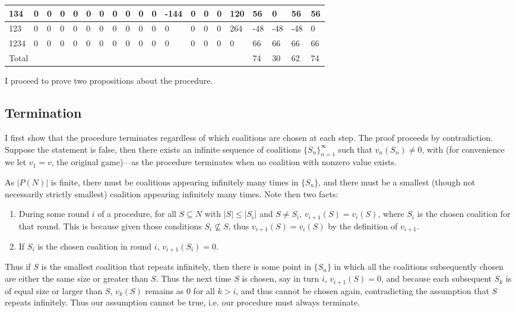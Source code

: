 \documentclass[12pt]{article}
\begin{document}
\begin{table}[h]
\begin{tabular}{|l|l|l|l|l|l|l|l|l|l|l|l|l|l|l|l|l|l|l|l|}
134  & 0  & 0  & 0  & 0  & 0  & 0   & 0   & 0   & 0    & 0   & -144 & 0    & 0   & 0    & 120  & 56     & 0      & 56     & 56    \\ \hline
123  & 0  & 0  & 0  & 0  & 0  & 0   & 0   & 0   & 0    & 0   & 0    & 0    & 0   & 0    & 264  & -48    & -48    & -48    & 0     \\ \hline
1234 & 0  & 0  & 0  & 0  & 0  & 0   & 0   & 0   & 0    & 0   & 0    & 0    & 0   & 0    & 0    & 66     & 66     & 66     & 66    \\ \hline
\multicolumn{16}{|l|}{Total}                                                                   & 74     & 30     & 62     & 74    \\ \hline
\end{tabular}
\end{table}

I proceed to prove two propositions about the procedure.

\subsection*{Termination}

I first show that the procedure terminates regardless of which coalitions are
chosen at each step. The proof proceeds by contradiction. Suppose the statement
is false,
then there exists an infinite sequence of coalitions $\{S_n\}_{n=1}^\infty$ such
that $v_{n}(S_n)\neq 0$, with (for convenience we let $v_1 = v$, the original
game)---as the procedure terminates when no coalition with nonzero value exists.

As $|P(N)|$ is finite, there must be coalitions appearing infinitely many times
in $\{S_n\}$, and there must be a smallest (though not necessarily strictly
smallest) coalition appearing infinitely many times. Note then two facts:
\begin{enumerate}
\item During some round $i$ of a procedure, for all $S \subseteq N$ with $|S|
  \leq |S_i|$ and $S \neq S_i$, $v_{i+1}(S) = v_i(S)$,
  where $S_i$ is the chosen coalition for that
  round. This is because given those conditions $S_i \not\subseteq S$, thus
  $v_{i+1}(S) = v_i(S)$ by the definition of $v_{i+1}$.
\item If $S_i$ is the chosen coalition in round $i$, $v_{i+1}(S_i) = 0$.
\end{enumerate}
Thus if $S$ is the smallest coalition that repeats infinitely, then there is some
point in $\{S_n\}$ in which all the coalitions subsequently chosen are either the
same size or greater than $S$. Thus the next time $S$ is chosen, say in turn
$i$, $v_{i+1}(S) = 0$, and because each subsequent $S_k$ is of equal size or
larger than $S$, $v_k(S)$ remains as 0 for all $k > i$, and thus cannot be chosen
again, contradicting the assumption that $S$ repeats infinitely. Thus our
assumption cannot be true, i.e. our procedure must always terminate.
\end{document}
